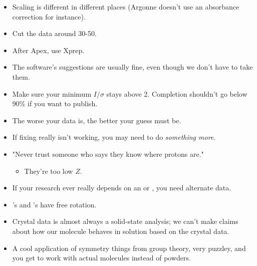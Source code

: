 \documentclass[../notes.tex]{subfiles}
\begin{document}
\begin{itemize}
    \item Scaling is different in different places (Argonne doesn't use an absorbance correction for instance).
    \item Cut the data around 30-50.
    \item After Apex, use Xprep.
    \item The software's suggestions are usually fine, even though we don't have to take them.
    \item Make sure your minimum $I/\sigma$ stays above 2. Completion shouldn't go below 90\% if you want to publish.
    \item The worse your data is, the better your guess must be.
    \item If fixing really isn't working, you may need to do \emph{something more}.
    \item "Never trust someone who says they know where protons are."
    \begin{itemize}
        \item They're too low $Z$.
    \end{itemize}
    \item If your research ever really depends on an  or , you need alternate data.
    \item {}'s and 's have free rotation.
    \item Crystal data is almost always a solid-state analysis; we can't make claims about how our molecule behaves in solution based on the crystal data.
    \item A cool application of symmetry things from group theory, very puzzley, and you get to work with actual molecules instead of powders.
\end{itemize}
\end{document}
